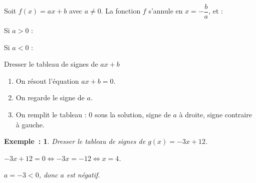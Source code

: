 \documentclass[12pt]{article}
\theoremstyle{break}
\theoremstyle{inline}
\newtheorem*{example*}{Exemple~:}
\begin{document}
\begin{proposition}{}{}
  \begin{multihide}
    Soit $f(x) = ax + b$ avec $a \neq 0$. La fonction $f$ s'annule en $x = -\dfrac{b}{a}$, et :%

    \medskip
    \begin{minipage}{0.48\linewidth}
      \centering
      Si $a > 0$ :
      \vspace{0.5em}

    \end{minipage}
    \hfill
    \begin{minipage}{0.48\linewidth}
      \centering
      Si $a < 0$ :
      \vspace{0.5em}

    \end{minipage}

  \end{multihide}
\end{proposition}

\begin{method}{Dresser le tableau de signes de $ax + b$}{}
  \begin{enumerate}
    \item On résout l'équation $ax + b = 0$.
    \item On regarde le signe de $a$.
    \item On remplit le tableau : $0$ sous la solution, signe de $a$ à droite, signe contraire à gauche.
  \end{enumerate}
\end{method}

\begin{example*}
  Dresser le tableau de signes de $g(x) = -3x + 12$.
  \begin{multihideW}
    \begin{minipage}{0.5\linewidth}
      $-3x + 12 = 0 \iff -3x = -12 \iff x = 4$.

      \smallskip
      $a = -3 < 0$, donc $a$ est négatif.
    \end{minipage}
    \hfill
    \begin{minipage}{0.45\linewidth}
    \end{minipage}
  \end{multihideW}
\end{example*}
\end{document}
